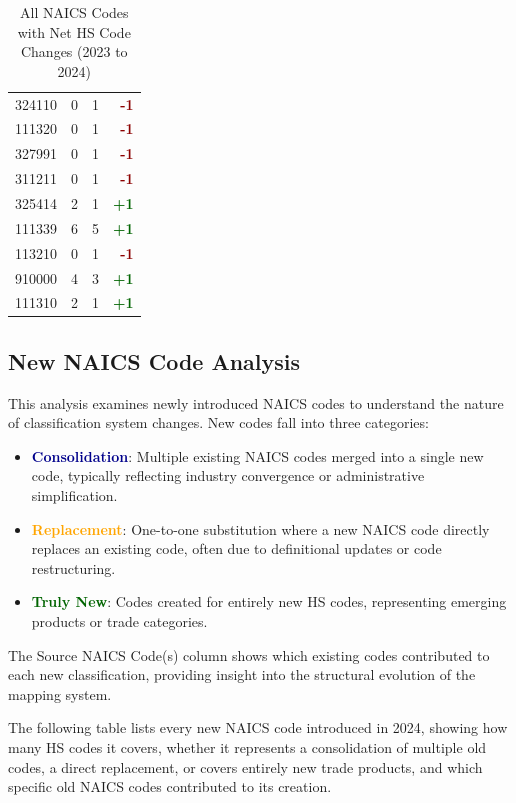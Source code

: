 \documentclass[11pt]{article}
\begin{document}
\begin{table}[H]
\begin{minipage}{0.48\textwidth}
\begin{tabular}{lrrr}
324110 & 0 & 1 & \textcolor{darkred}{\textbf{-1}} \\
111320 & 0 & 1 & \textcolor{darkred}{\textbf{-1}} \\
327991 & 0 & 1 & \textcolor{darkred}{\textbf{-1}} \\
311211 & 0 & 1 & \textcolor{darkred}{\textbf{-1}} \\
325414 & 2 & 1 & \textcolor{darkgreen}{\textbf{+1}} \\
111339 & 6 & 5 & \textcolor{darkgreen}{\textbf{+1}} \\
113210 & 0 & 1 & \textcolor{darkred}{\textbf{-1}} \\
910000 & 4 & 3 & \textcolor{darkgreen}{\textbf{+1}} \\
111310 & 2 & 1 & \textcolor{darkgreen}{\textbf{+1}} \\
\bottomrule
\end{tabular}
\end{minipage}
\caption{All NAICS Codes with Net HS Code Changes (2023 to 2024)}
\end{table}


\subsection{New NAICS Code Analysis}

This analysis examines newly introduced NAICS codes to understand the nature of classification system changes. New codes fall into three categories:

\begin{itemize}
    \item \textcolor{darkblue}{\textbf{Consolidation}}: Multiple existing NAICS codes merged into a single new code, typically reflecting industry convergence or administrative simplification.
    \item \textcolor{orange}{\textbf{Replacement}}: One-to-one substitution where a new NAICS code directly replaces an existing code, often due to definitional updates or code restructuring.
    \item \textcolor{darkgreen}{\textbf{Truly New}}: Codes created for entirely new HS codes, representing emerging products or trade categories.
\end{itemize}

The Source NAICS Code(s) column shows which existing codes contributed to each new classification, providing insight into the structural evolution of the mapping system.

The following table lists every new NAICS code introduced in 2024, showing how many HS codes it covers, whether it represents a consolidation of multiple old codes, a direct replacement, or covers entirely new trade products, and which specific old NAICS codes contributed to its creation.
\end{document}
